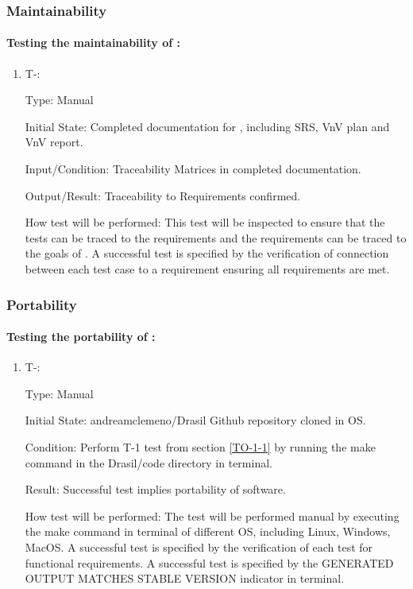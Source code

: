 \documentclass[12pt, titlepage]{article}
\newcounter{tinnum} %
\begin{document}
\subsubsection{Maintainability} \label{nonfunc_maintainability}
\paragraph{Testing the maintainability of \progname{}:}

\begin{enumerate}

\item{T-}\thetinnum\label{T-13}:

Type: Manual
					
Initial State: Completed documentation for \progname{}, including SRS, VnV plan 
and VnV report.
					
Input/Condition: Traceability Matrices in completed documentation.
					
Output/Result: Traceability to Requirements confirmed. 
					
How test will be performed: This test will be inspected to ensure that the tests 
can be traced to the requirements and the requirements can be traced to the 
goals of \progname{}. A successful test is specified by the verification of connection between each test case to a requirement ensuring all requirements are met.
					

\end{enumerate}

\subsubsection{Portability} \label{nonfunc_portability}

\paragraph{Testing the portability of \progname{}:}

\begin{enumerate}

\item{T-}\thetinnum\label{T-14}:

Type: Manual
					
Initial State: andreamclemeno/Drasil Github repository cloned in OS.
					
Condition: Perform T-1 test from section \ref{TO-1-1} by running the make command in the Drasil/code directory in terminal.
					
Result: Successful test implies portability of software.

How test will be performed: The test will be performed manual by executing the 
make command in terminal of different OS, including Linux, Windows, MacOS.  A successful test is specified by the verification of each test for functional requirements. A successful test is specified by the GENERATED OUTPUT MATCHES STABLE VERSION indicator in terminal.
					
\end{enumerate}
\end{document}
